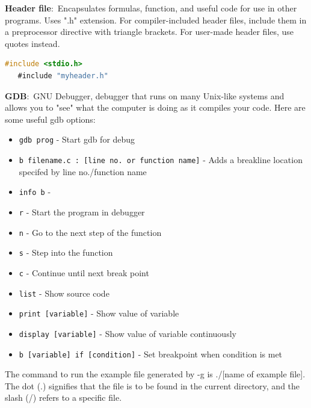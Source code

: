 \documentclass[nobib]{tufte-handout}
\newcommand{\defn}[2]{\noindent\textbf{#1}:\ #2}
\begin{document}
\defn{Header file}{Encapsulates formulas, function, and 
useful code for use in other programs. Uses ".h" extension.} For
compiler-included header files, include them in a preprocessor
directive with triangle brackets. For user-made header files,
use quotes instead. 
\begin{lstlisting}[language=C,caption=Header file usage]
   #include <stdio.h>
   #include "myheader.h"
\end{lstlisting}

\defn{GDB}{GNU Debugger, debugger that runs on many 
Unix-like systems and allows you to "see" what the computer
is doing as it compiles your code.}
Here are some useful gdb options:
\begin{itemize}
   \item \texttt{gdb prog} - Start gdb for debug
   \item \texttt{b filename.c : [line no. or function name]} - Adds a breakline location specifed by line no./function name
   \item \texttt{info b} - 
   \item \texttt{r} - Start the program in debugger
   \item \texttt{n} - Go to the next step of the function
   \item \texttt{s} - Step into the function
   \item \texttt{c} - Continue until next break point
   \item \texttt{list} - Show source code
   \item \texttt{print [variable]} - Show value of variable
   \item \texttt{display [variable]} - Show value of variable continuously
   \item \texttt{b [variable] if [condition]} - Set breakpoint when condition is met
\end{itemize}
The command to run the example file generated by -g is ./[name of example file].
The dot (.) signifies that the file is to be found in the current directory,
and the slash (/) refers to a specific file.
\end{document}
